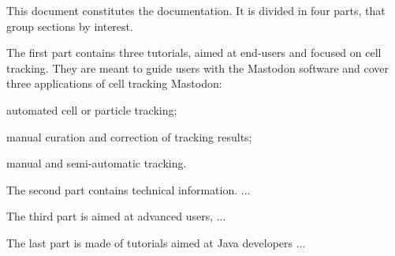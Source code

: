 This document constitutes the  documentation. 
It is divided in four parts, that group sections by interest.
\begin{myitemize}
	
	\item The first part contains three tutorials, aimed at end-users and focused on cell tracking.
	They are meant to guide users with the Mastodon software and cover three applications of cell tracking Mastodon:
	\begin{myitemize}
		\item automated cell or particle tracking;
		\item manual curation and correction of tracking results;
		\item manual and semi-automatic tracking.
	\end{myitemize}
	
	\item The second part contains technical information. ...
	
	\item The third part is aimed at advanced users, ...
	
	\item The last part is made of tutorials aimed at Java developers ...
	
\end{myitemize}
